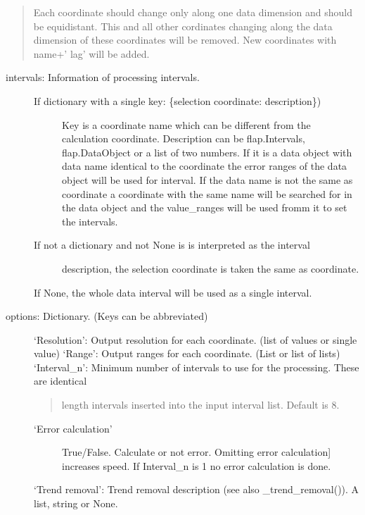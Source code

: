 \documentclass[letterpaper,10pt,english]{sphinxmanual}
\begin{document}
\begin{fulllineitems}
\begin{fulllineitems}
\begin{description}
\begin{quote}
Each coordinate should change only along one data dimension and should be equidistant.
This and all other cordinates changing along the data dimension of
these coordinates will be removed. New coordinates with name+’ lag’ will be added.
\end{quote}
\begin{description}
\item[{intervals: Information of processing intervals.}] \leavevmode\begin{description}
\item[{If dictionary with a single key: \{selection coordinate: description\})}] \leavevmode
Key is a coordinate name which can be different from the calculation
coordinate.
Description can be flap.Intervals, flap.DataObject or
a list of two numbers. If it is a data object with data name identical to
the coordinate the error ranges of the data object will be used for
interval. If the data name is not the same as coordinate a coordinate with the
same name will be searched for in the data object and the value\_ranges
will be used fromm it to set the intervals.

\item[{If not a dictionary and not None is is interpreted as the interval}] \leavevmode
description, the selection coordinate is taken the same as
coordinate.

\end{description}

If None, the whole data interval will be used as a single interval.

\item[{options: Dictionary. (Keys can be abbreviated)}] \leavevmode
‘Resolution’: Output resolution for each coordinate. (list of values or single value)
‘Range’: Output ranges for each coordinate. (List or list of lists)
‘Interval\_n’: Minimum number of intervals to use for the processing. These are identical
\begin{quote}

length intervals inserted into the input interval list. Default is 8.
\end{quote}
\begin{description}
\item[{‘Error calculation’}] \leavevmode{[}True/False. Calculate or not error. Omitting error calculation{]}
increases speed. If Interval\_n is 1 no error calculation is done.

\item[{‘Trend removal’: Trend removal description (see also \_trend\_removal()). A list, string or None.}] \leavevmode\begin{quote}


\end{quote}
\end{description}
\end{description}
\end{description}
\end{fulllineitems}
\end{fulllineitems}
\end{document}
